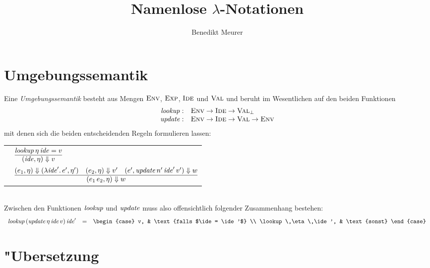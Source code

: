 \documentclass[12pt,a4paper]{article}
\begin{document}
\title{Namenlose $\lambda$-Notationen}
\author{Benedikt Meurer}
\maketitle


\section{Umgebungssemantik}

Eine \emph{Umgebungssemantik} besteht aus Mengen $\textsc{Env}$, $\textsc{Exp}$, $\textsc{Ide}$ und $\textsc{Val}$ und beruht im
Wesentlichen auf den beiden Funktionen
\[\begin{array}{rl}
  \mathit{lookup}: & \textsc{Env} \to \textsc{Ide} \to \textsc{Val}_\bot \\
  \mathit{update}: & \textsc{Env} \to \textsc{Ide} \to \textsc{Val} \to \textsc{Env} 
\end{array}\]
mit denen sich die beiden entscheidenden Regeln formulieren lassen: \\[3mm]
\begin{tabular}{rl}
  \RN{Lookup} & $\RULE{\lookup\,\eta\,\ide = v}{(\ide,\eta) \Downarrow v}$ \\[3mm]
  \RN{Beta-V} & $\RULE{(e_1,\eta) \Downarrow (\abstr{\ide'}{e'},\eta') \quad (e_2,\eta) \Downarrow v' \quad (e',\update\,n'\,\ide'\,v') \Downarrow w}{(\app{e_1}{e_2},\eta) \Downarrow w}$ \\[3mm]
\end{tabular} \\[3mm]
Zwischen den Funktionen $\mathit{lookup}$ und $\mathit{update}$ muss also offensichtlich folgender
Zusammenhang bestehen:
\[\begin{array}{rcl}
  \lookup\,(\update\,\eta\,\ide\,v)\,\ide'
  &=&
  \begin{case}
    v, & \text{falls $\ide = \ide'$} \\
    \lookup\,\eta\,\ide', & \text{sonst}
  \end{case}
\end{array}\]


\section{"Ubersetzung}
\end{document}
